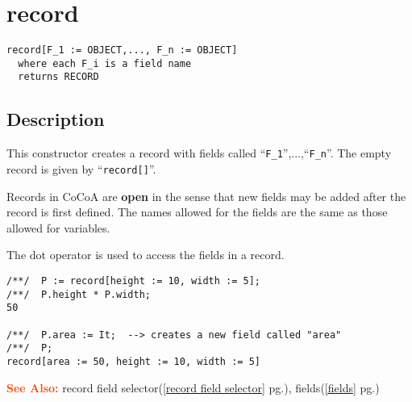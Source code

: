 \documentclass[a4paper]{mybook}
\newenvironment{command}{}{} %
\newcommand\SeeAlso{\par\textcolor{OrangeRed}{\textbf{\large See Also: }}}
\begin{document}
\section{record}
\label{record}
\begin{command} %


\begin{Verbatim}[label=syntax, rulecolor=\color{MidnightBlue},
frame=single]
record[F_1 := OBJECT,..., F_n := OBJECT]
  where each F_i is a field name
  returns RECORD
\end{Verbatim}


\subsection*{Description}

This constructor creates a record with fields called ``\verb&F_1&'',...,``\verb&F_n&''.
The empty record is given by ``\verb&record[]&''.

Records in CoCoA are \textbf{open} in the sense that new fields may be
added after the record is first defined.  The names allowed for the
fields are the same as those allowed for variables.
\par 
The dot operator is used to access the fields in a record.
\begin{Verbatim}[label=example, rulecolor=\color{PineGreen}, frame=single]
/**/  P := record[height := 10, width := 5];
/**/  P.height * P.width;
50

/**/  P.area := It;  --> creates a new field called "area"
/**/  P;
record[area := 50, height := 10, width := 5]
\end{Verbatim}


\SeeAlso %
  record field selector(\ref{record field selector} pg.\pageref{record field selector}), 
    fields(\ref{fields} pg.\pageref{fields})
\end{command} %
\end{document}
